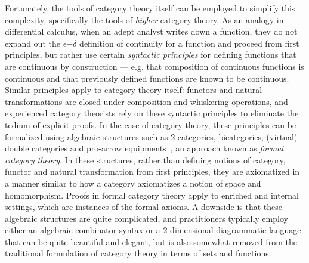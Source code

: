 \documentclass{llncs}
\begin{document}
Fortunately, the tools of category theory itself can be employed to
simplify this complexity, specifically the tools of \emph{higher}
category theory.
%
As an analogy in differential calculus, when an adept analyst writes
down a function, they do not expand out the $\epsilon\mathord{-}\delta$
definition of continuity for a function and proceed from first
principles, but rather use certain \emph{syntactic principles} for
defining functions that are continuous by construction --- e.g. that
composition of continuous functions is continuous and that previously
defined functions are known to be continuous.
%
Similar principles apply to category theory itself: functors and
natural transformations are closed under composition and whiskering
operations, and experienced category theorists rely on these syntactic
principles to eliminate the tedium of explicit proofs.
%
In the case of category theory, these principles can be formalized
using algebraic structures such as 2-categories, bicategories,
(virtual) double categories and pro-arrow equipments~\cite{bicategories,proarrow-equipments,LEINSTER2002391,Cruttwell2010}, an
approach known as \emph{formal category theory}.
%
In these structures, rather than defining notions of category, functor
and natural transformation from first principles, they are axiomatized
in a manner similar to how a category axiomatizes a notion of space
and homomorphism.
%
Proofs in formal category theory apply to enriched and internal
settings, which are instances of the formal axioms.
%
A downside is that these algebraic structures are quite complicated, and
practitioners typically employ either an algebraic combinator syntax or
a 2-dimensional diagrammatic language that can be quite beautiful and
elegant, but is also somewhat removed from the traditional formulation
of category theory in terms of sets and functions.
\end{document}
